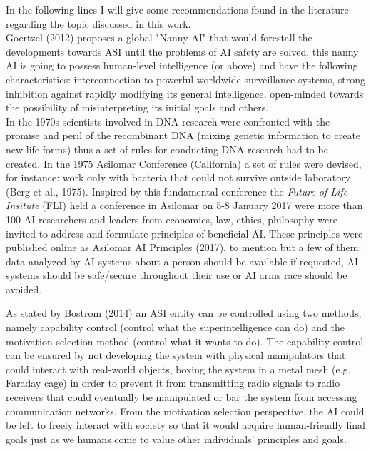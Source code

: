 \documentclass[11pt]{article}
\begin{document}
	\indent
	In the following lines I will give some recommendations found in the literature regarding the topic discussed in this work.\\
	\indent
	Goertzel (2012) proposes a global "Nanny AI" that would forestall the developments towards ASI until the problems of AI safety are solved, this nanny AI is going to possess human-level intelligence (or above) and have the following characteristics: interconnection to powerful worldwide surveillance systems, strong inhibition against rapidly modifying its general intelligence, open-minded towards the possibility of misinterpreting its initial goals and others.  \\
	\indent
	In the 1970s scientists involved in DNA research were confronted with the promise and peril of the recombinant DNA (mixing genetic information to create new life-forms) thus a set of rules for conducting DNA research had to be created. In the 1975 Asilomar Conference (California) a set of rules were devised, for instance: work only with bacteria that could not survive outside laboratory (Berg et al., 1975). Inspired by this fundamental conference the \textit{Future of Life Insitute} (FLI) held a conference in Asilomar on 5-8 January 2017 were more than 100 AI researchers and leaders from economics, law, ethics, philosophy were invited to address and formulate principles of beneficial AI. These principles were published online  as Asilomar AI Principles (2017), to mention but a few of them: data analyzed by AI systems about a person should be available if requested, AI systems should be safe/secure throughout their use or AI arms race should be avoided.  
	
	\indent
	As stated by Bostrom (2014) an ASI entity can be controlled using two methods, namely capability control (control what the superintelligence can do) and the  motivation selection method (control what it wants to do). The capability control can be ensured by not developing the system with physical manipulators that could interact with real-world objects, boxing the system in a metal mesh (e.g. Faraday cage) in order to prevent it from transmitting radio signals to radio receivers that could eventually be manipulated or bar the system from accessing communication networks. From the motivation selection perspective, the AI could be left to freely interact with society so that it would acquire human-friendly final goals just as we humans come to value other individuals' principles and goals.\\
\end{document}
